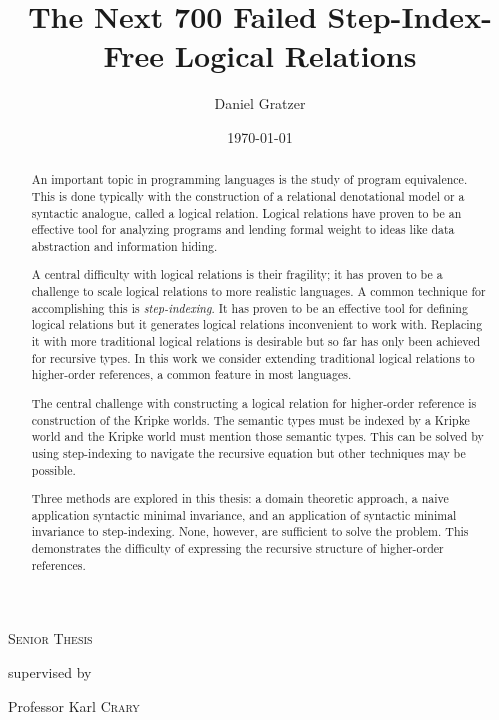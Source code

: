 \documentclass{article}
\title{The Next 700 Failed Step-Index-Free Logical Relations}
\author{Daniel Gratzer}
\date{\today}
\begin{document}
\begin{titlepage}
  \makeatletter
  \centering
  {\scshape\Large Senior Thesis\par}
  \vspace{1.5cm}
  {\huge\bfseries \@title\par}
  \vspace{2cm}
  {\Large\itshape \@author\par}
  \vfill
  supervised by\par
  Professor Karl \textsc{Crary}

  \vfill

  {\large \@date\par}
  \makeatother
\end{titlepage}

\begin{abstract}
  An important topic in programming languages is the study of
  program equivalence. This is done typically with the construction of
  a relational denotational model or a syntactic analogue, called a
  logical relation. Logical relations have proven to be an effective
  tool for analyzing programs and lending formal weight to ideas like
  data abstraction and information hiding.

  A central difficulty with logical relations is their fragility; it
  has proven to be a challenge to scale logical relations to more
  realistic languages. A common technique for accomplishing this is
  \emph{step-indexing}. It has proven to be an effective tool for
  defining logical relations but it generates logical relations
  inconvenient to work with. Replacing it with more traditional
  logical relations is desirable but so far has only been achieved for
  recursive types. In this work we consider extending traditional
  logical relations to higher-order references, a common feature in
  most languages.

  The central challenge with constructing a logical relation for
  higher-order reference is construction of the Kripke worlds. The
  semantic types must be indexed by a Kripke world and the Kripke
  world must mention those semantic types. This can be solved by using
  step-indexing to navigate the recursive equation but other
  techniques may be possible.

  Three methods are explored in this thesis: a domain theoretic
  approach, a naive application syntactic minimal invariance, and an
  application of syntactic minimal invariance to step-indexing. None,
  however, are sufficient to solve the problem. This demonstrates the
  difficulty of expressing the recursive structure of higher-order
  references.
\end{abstract}

\newpage












\end{document}
